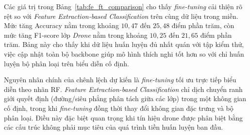 \documentclass[../DoAn.tex]{subfiles}
\begin{document}
\begin{table}[H]
    \centering
    \renewcommand{\arraystretch}{1.3}
    \small
    \setlength{\tabcolsep}{4pt}
    \caption{So sánh \textit{Feature Extraction-based Classification} và \textit{fine-tuning} trong miền}
    \label{tab:fe_ft_comparison}
\end{table}


Các giá trị trong Bảng~\ref{tab:fe_ft_comparison} cho thấy \textit{fine-tuning} cải thiện rõ rệt so với \textit{Feature Extraction-based Classification} trên cùng dữ liệu trong miền. Mức tăng Accuracy nằm trong khoảng $10{,}47$ đến $25{,}48$ điểm phần trăm, còn mức tăng F1-score lớp \textit{Drone} nằm trong khoảng $10{,}25$ đến $21{,}65$ điểm phần trăm. Bảng này cho thấy khi dữ liệu huấn luyện đủ nhất quán với tập kiểm thử, việc cập nhật toàn bộ backbone giúp mô hình thích nghi tốt hơn so với chỉ huấn luyện bộ phân loại trên biểu diễn cố định.

Nguyên nhân chính của chênh lệch dự kiến là \textit{fine-tuning} tối ưu trực tiếp biểu diễn theo nhãn RF. \textit{Feature Extraction-based Classification} chỉ dịch chuyển ranh giới quyết định (đường/siêu phẳng phân tách giữa các lớp) trong một không gian cố định, trong khi \textit{fine-tuning} đồng thời thay đổi không gian đặc trưng và bộ phân loại. Điều này đặc biệt quan trọng khi tín hiệu drone được phân biệt bằng các cấu trúc không phải mục tiêu của quá trình tiền huấn luyện ban đầu.
\end{document}
